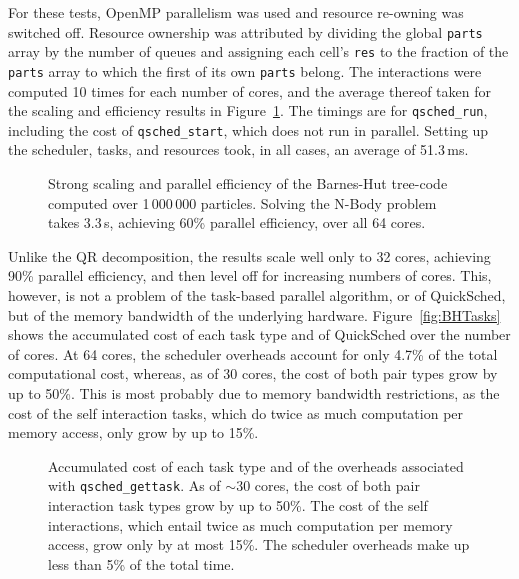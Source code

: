\documentclass[preprint]{elsarticle}
\newcommand{\fig}[1]
    {Figure~\ref{fig:#1}}
\begin{document}
For these tests, OpenMP parallelism was used and resource
re-owning was switched off.
Resource ownership was attributed by dividing the global
{\tt parts} array by the number of queues and assigning each cell's
{\tt res} to the fraction of the {\tt parts} array to which
the first of its own {\tt parts} belong.
The interactions were computed 10 times for each number of
cores, and the average thereof taken for the scaling and
efficiency results in \fig{BHResults}.
The timings are for {\tt qsched\_run}, including the cost of
{\tt qsched\_start}, which does not run in parallel.
Setting up the scheduler, tasks, and resources took, in all
cases, an average of 51.3\,ms.

\begin{figure}
    \centerline{}
    \caption{Strong scaling and parallel efficiency of the Barnes-Hut tree-code
        computed over 1\,000\,000 particles.
        Solving the N-Body problem takes 3.3\,s, achieving 60\% parallel
        efficiency, over all 64 cores.
        }
    \label{fig:BHResults}
\end{figure}

Unlike the QR decomposition, the results scale well only to
32 cores, achieving 90\% parallel efficiency, and then
level off for increasing numbers of cores.
This, however, is not a problem of the task-based parallel
algorithm, or of QuickSched, but of the memory bandwidth
of the underlying hardware.
\fig{BHTasks} shows the accumulated cost of each task type and of 
QuickSched over the number of cores.
At 64 cores, the scheduler overheads account for only 4.7\% of
the total computational cost, whereas,
as of 30 cores, the cost of both pair types grow by up to
50\%.
This is most probably due to memory bandwidth restrictions, as
the cost of the self interaction tasks, which do twice as much
computation per memory access, only grow by up to 15\%.

\begin{figure}
    \centerline{}
    \caption{Accumulated cost of each task type and of the overheads
        associated with {\tt qsched\_gettask}.
        As of $\sim 30$ cores, the cost of both pair interaction task
        types grow by up to 50\%.
        The cost of the self interactions, which entail twice as much
        computation per memory access, grow only by at most 15\%.
        The scheduler overheads make up less than 5\% of the total
        time.
        }
    \label{fig:BHTimes}
\end{figure}
\end{document}
